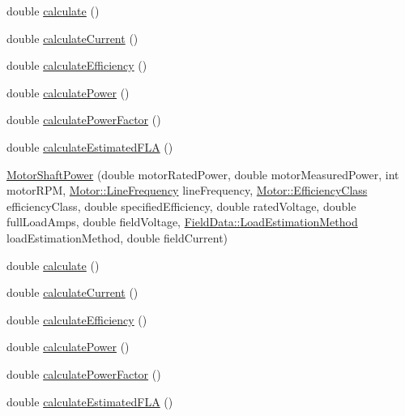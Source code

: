 \begin{DoxyCompactItemize}
\item 
double \hyperlink{class_motor_shaft_power_a65fc4f52753011c5a49376bc79bf81bc}{calculate} ()
\item 
double \hyperlink{class_motor_shaft_power_a3ce530d426fa14223199d89f54f34244}{calculate\+Current} ()
\item 
double \hyperlink{class_motor_shaft_power_ab7df0b41dc9d1bc6a591f0ab8f57b7ee}{calculate\+Efficiency} ()
\item 
double \hyperlink{class_motor_shaft_power_a4a2756922b290bec13550110aac25b8c}{calculate\+Power} ()
\item 
double \hyperlink{class_motor_shaft_power_aa7e9eb3a219c86f0ee0fb5b3d733b60a}{calculate\+Power\+Factor} ()
\item 
double \hyperlink{class_motor_shaft_power_a120b76be1b3b9fc3d67e37ecee0eb767}{calculate\+Estimated\+F\+LA} ()
\item 
\hyperlink{class_motor_shaft_power_a1695ae98d73b9813f2c049f627cc87f5}{Motor\+Shaft\+Power} (double motor\+Rated\+Power, double motor\+Measured\+Power, int motor\+R\+PM, \hyperlink{class_motor_acee1bdf1b684ad36cb80dc2829d9fcee}{Motor\+::\+Line\+Frequency} line\+Frequency, \hyperlink{class_motor_afa022971ae062406a9f588c601673d4e}{Motor\+::\+Efficiency\+Class} efficiency\+Class, double specified\+Efficiency, double rated\+Voltage, double full\+Load\+Amps, double field\+Voltage, \hyperlink{class_field_data_a424e89914ba5684c01bb269dbe3312fd}{Field\+Data\+::\+Load\+Estimation\+Method} load\+Estimation\+Method, double field\+Current)
\item 
double \hyperlink{class_motor_shaft_power_a65fc4f52753011c5a49376bc79bf81bc}{calculate} ()
\item 
double \hyperlink{class_motor_shaft_power_a3ce530d426fa14223199d89f54f34244}{calculate\+Current} ()
\item 
double \hyperlink{class_motor_shaft_power_ab7df0b41dc9d1bc6a591f0ab8f57b7ee}{calculate\+Efficiency} ()
\item 
double \hyperlink{class_motor_shaft_power_a4a2756922b290bec13550110aac25b8c}{calculate\+Power} ()
\item 
double \hyperlink{class_motor_shaft_power_aa7e9eb3a219c86f0ee0fb5b3d733b60a}{calculate\+Power\+Factor} ()
\item 
double \hyperlink{class_motor_shaft_power_a120b76be1b3b9fc3d67e37ecee0eb767}{calculate\+Estimated\+F\+LA} ()
\end{DoxyCompactItemize}
